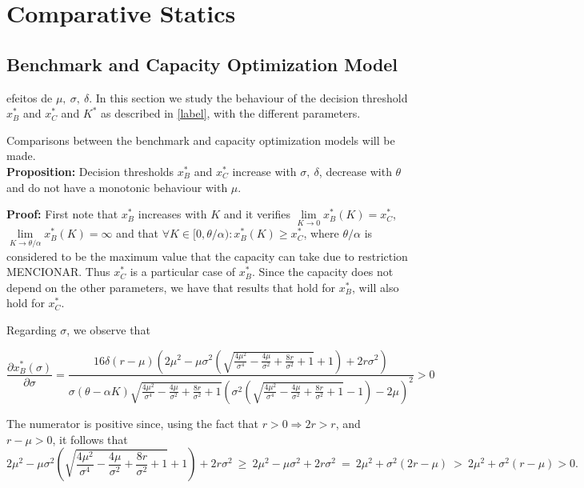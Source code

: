 \section{Comparative Statics}

\subsection{Benchmark and Capacity Optimization Model}
efeitos de $\mu, \ \sigma, \ \delta$.
In this section we study the behaviour of the decision threshold $x^*_B$ and $x^*_{C}$ and $K^*$ as described in \eqref{label}, with
the different parameters.

Comparisons between the benchmark and capacity optimization models will be made.\\
\textbf{Proposition:}
Decision thresholds $x^*_B$ and $x^*_{C}$ increase with $ \sigma, \ \delta$, decrease with $\theta$ and do not have a monotonic behaviour with $\mu$.


\textbf{Proof:}
First note that $x^*_B$ increases with $K$ and it verifies $\lim \limits_{K \to 0} x^*_B(K)=x^*_{C}$, $\lim \limits_{K \to \theta/\alpha} x^*_B(K)=\infty$ and that $\forall K \in [0, \theta/\alpha): x^*_B(K)\geq x^*_{C}$, where $\theta/ \alpha$ is considered to be the maximum value that the capacity can take due to restriction MENCIONAR. Thus $x^*_C$ is a particular case of $x^*_B$. Since the capacity does not depend on the other parameters, we have that results that hold for $x^*_B$, will also hold for $x^*_C$. 

Regarding $\sigma$, we observe that

     $$    \frac{\partial x^*_B ( \sigma ) }{\partial \sigma}= 
\frac{16 \delta (r-\mu) \left(2 \mu ^2-\mu  \sigma ^2 \left(\sqrt{\frac{4 \mu ^2}{\sigma ^4}-\frac{4 \mu }{\sigma ^2}+\frac{8 r}{\sigma ^2}+1}+1\right)+2 r \sigma ^2\right)}{\sigma  (\theta-\alpha K) \sqrt{\frac{4 \mu ^2}{\sigma ^4}-\frac{4 \mu }{\sigma ^2}+\frac{8 r}{\sigma ^2}+1} \left(\sigma ^2 \left(\sqrt{\frac{4 \mu ^2}{\sigma ^4}-\frac{4 \mu }{\sigma ^2}+\frac{8 r}{\sigma ^2}+1}-1\right)-2 \mu \right)^2}>0$$

The numerator is positive since, using the fact that $r>0 \Rightarrow 2r>r$, and $r-\mu>0$, it follows that
\begin{equation}
2 \mu ^2-\mu  \sigma ^2 \left(\sqrt{\frac{4 \mu ^2}{\sigma ^4}-\frac{4 \mu }{\sigma ^2}+\frac{8 r}{\sigma ^2}+1}+1\right)+2 r \sigma ^2 \
\geq \ 2 \mu ^2-\mu  \sigma^2+ 2r \sigma ^2 \ 
= \  2 \mu ^2+ \sigma^2 (2 r-\mu) \ > \ 2 \mu ^2+ \sigma^2 (r-\mu) >0.
\label{demo}
\end{equation}

